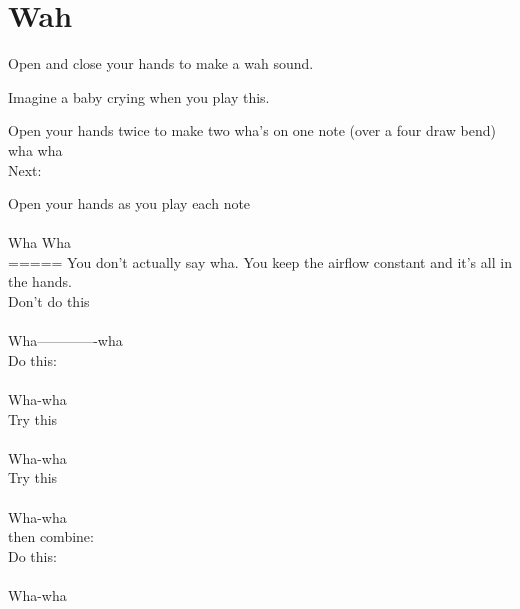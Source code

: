 \section{Wah}
Open and close your hands to make a wah sound.

Imagine a baby crying when you play this.

Open your hands twice to make two wha's on one note (over a four draw bend) \\
\fdb
wha wha\\

Next:

Open your hands as you play each note
\\
\fdb \4 \\

Wha   Wha\\


=====
\newpage
You don't actually say wha. You keep the airflow constant and it's all in the hands.
\\

Don't do this \\

\fdb \4  \fdb \4 \\
 Wha-------------wha \\
 
 
 Do this: \\
 \fdb \4  \\
 Wha-wha \\
 
 Try this \\
 \4 \4  \\
 Wha-wha \\
 
 
 Try this \\
 \fbd \4  \\
 Wha-wha \\
 
 then combine: \\
 Do this: \\
 \fdb \4  \\
 Wha-wha \\